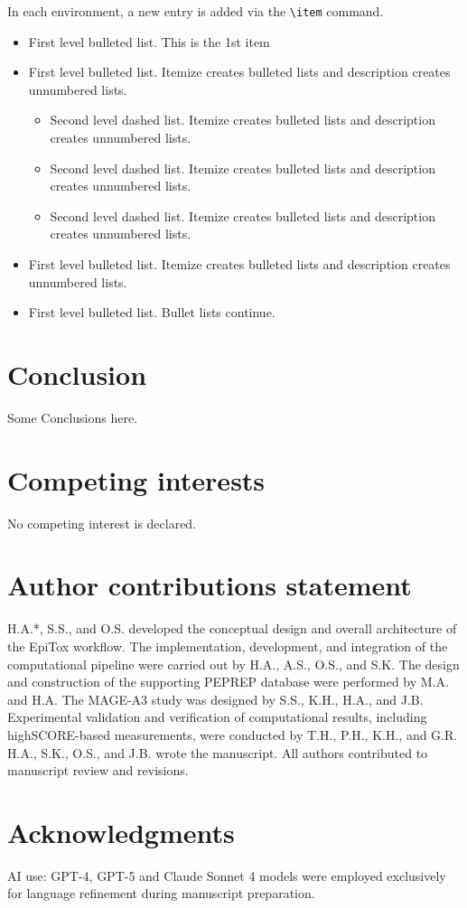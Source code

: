 \documentclass[unnumsec,webpdf,contemporary,large]{oup-authoring-template}%
\theoremstyle{thmstyleone}%
\theoremstyle{thmstyletwo}%
\theoremstyle{thmstylethree}%
\begin{document}
In each environment, a new entry is added via the \verb+\item+ command.
\begin{itemize}
\item First level bulleted list. This is the 1st item

\item First level bulleted list. Itemize creates bulleted lists and description creates unnumbered lists.
\begin{itemize}
\item Second level dashed list. Itemize creates bulleted lists and description creates unnumbered lists.

\item Second level dashed list. Itemize creates bulleted lists and description creates unnumbered lists.

\item Second level dashed list. Itemize creates bulleted lists and description creates unnumbered lists.
\end{itemize}

\item First level bulleted list. Itemize creates bulleted lists and description creates unnumbered lists.

\item First level bulleted list. Bullet lists continue.
\end{itemize}


\section{Conclusion}

Some Conclusions here.

\section{Competing interests}
No competing interest is declared.

\section{Author contributions statement}
    H.A.*, S.S., and O.S. developed the conceptual design and overall architecture of the EpiTox workflow. The implementation, development, and integration of the computational pipeline were carried out by H.A., A.S., O.S., and S.K. The design and construction of the supporting PEPREP database were performed by M.A. and H.A. The MAGE-A3 study was designed by S.S., K.H., H.A., and J.B. Experimental validation and verification of computational results, including highSCORE-based measurements, were conducted by T.H., P.H., K.H., and G.R. H.A., S.K., O.S., and J.B. wrote the manuscript. All authors contributed to manuscript review and revisions.

\section{Acknowledgments}
AI use: GPT-4, GPT-5 and Claude Sonnet 4 models were employed exclusively for language
refinement during manuscript preparation.



\end{document}
